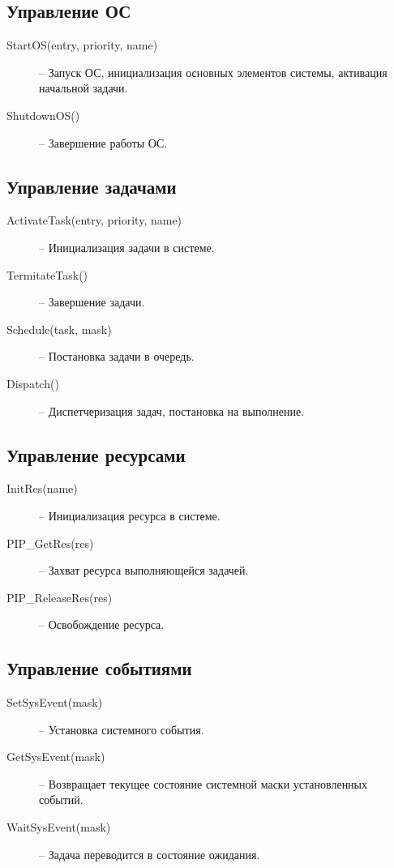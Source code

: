 \subsection{Управление ОС}

\begin{description}
  \item[StartOS(entry, priority, name)] -- Запуск ОС, инициализация основных элементов системы, активация начальной задачи.
  \item[ShutdownOS()] -- Завершение работы ОС. 
\end{description}

\subsection{Управление задачами}

\begin{description}
  \item[ActivateTask(entry, priority, name)] -- Инициализация задачи в системе.
  \item[TermitateTask()] -- Завершение задачи.
  \item[Schedule(task, mask)] -- Постановка задачи в очередь.
  \item[Dispatch()] -- Диспетчеризация задач, постановка на выполнение.
\end{description}

\subsection{Управление ресурсами}

\begin{description}
  \item[InitRes(name)] -- Инициализация ресурса в системе.
  \item[PIP\_GetRes(res)] -- Захват ресурса выполняющейся задачей.
  \item[PIP\_ReleaseRes(res)] -- Освобождение ресурса.
\end{description}

\subsection{Управление событиями}
\begin{description}
  \item[SetSysEvent(mask)] -- Установка системного события.
  \item[GetSysEvent(mask)] -- Возвращает текущее состояние системной маски установленных событий.
  \item[WaitSysEvent(mask)] -- Задача переводится в состояние ожидания.
\end{description}